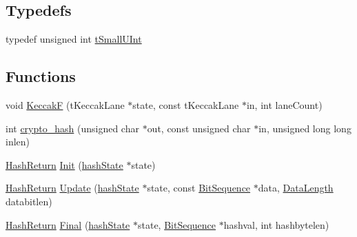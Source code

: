\subsection*{Typedefs}
\begin{DoxyCompactItemize}
\item 
typedef unsigned int \hyperlink{Keccak-compact_8c_a45959559b5cbc9df13f4f87b8fee86af}{t\-Small\-U\-Int}
\end{DoxyCompactItemize}
\subsection*{Functions}
\begin{DoxyCompactItemize}
\item 
void \hyperlink{Keccak-compact_8c_a83210af51034e54b652e76d33f55367d}{Keccak\-F} (t\-Keccak\-Lane $\ast$state, const t\-Keccak\-Lane $\ast$in, int lane\-Count)
\item 
int \hyperlink{Keccak-compact_8c_a92cd4d0a323107c62536ab7bba8e5d6e}{crypto\-\_\-hash} (unsigned char $\ast$out, const unsigned char $\ast$in, unsigned long long inlen)
\item 
\hyperlink{Keccak-compact_8h_a8291024a9e890d5d4d60dc3c76d2b44c}{Hash\-Return} \hyperlink{Keccak-compact_8c_a1b8c8a006dfc4249184547e855352b24}{Init} (\hyperlink{Keccak-compact_8h_a6cd75f9e7106362b1576ff73d4cc6a3b}{hash\-State} $\ast$state)
\item 
\hyperlink{Keccak-compact_8h_a8291024a9e890d5d4d60dc3c76d2b44c}{Hash\-Return} \hyperlink{Keccak-compact_8c_afdec6f2494afd29ec80747223d1acf73}{Update} (\hyperlink{Keccak-compact_8h_a6cd75f9e7106362b1576ff73d4cc6a3b}{hash\-State} $\ast$state, const \hyperlink{Keccak-compact_8h_ac7449f64e35526a4e70f37cbc40ecc65}{Bit\-Sequence} $\ast$data, \hyperlink{Keccak-compact_8h_aa1c06fb4773a4b043c077daf86fb9d87}{Data\-Length} databitlen)
\item 
\hyperlink{Keccak-compact_8h_a8291024a9e890d5d4d60dc3c76d2b44c}{Hash\-Return} \hyperlink{Keccak-compact_8c_a0bc149d576bf1e0725f19cb49f3e23c0}{Final} (\hyperlink{Keccak-compact_8h_a6cd75f9e7106362b1576ff73d4cc6a3b}{hash\-State} $\ast$state, \hyperlink{Keccak-compact_8h_ac7449f64e35526a4e70f37cbc40ecc65}{Bit\-Sequence} $\ast$hashval, int hashbytelen)
\end{DoxyCompactItemize}
